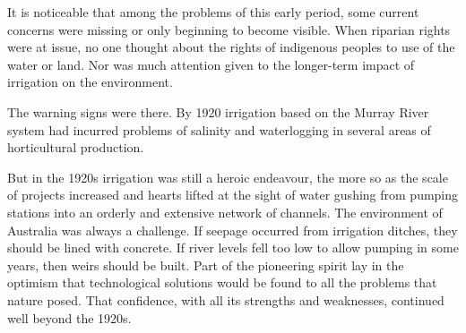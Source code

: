 It is noticeable that among the problems of this early period, some
current concerns were missing or only beginning to become
visible. When riparian rights were at issue, no one thought about the
rights of indigenous peoples to use of the water or land. Nor was much
attention given to the longer-term impact of irrigation on the
environment.

The warning signs were there. By 1920 irrigation based on the Murray
River system had incurred problems of salinity and waterlogging in
several areas of horticultural production.

But in the 1920s irrigation was still a heroic endeavour, the more so
as the scale of projects increased and hearts lifted at the sight of
water gushing from pumping stations into an orderly and extensive
network of channels. The environment of Australia was always a
challenge. If seepage occurred from irrigation ditches, they should be
lined with concrete. If river levels fell too low to allow pumping in
some years, then weirs should be built. Part of the pioneering spirit
lay in the optimism that technological solutions would be found to all
the problems that nature posed. That confidence, with all its
strengths and weaknesses, continued well beyond the 1920s.
